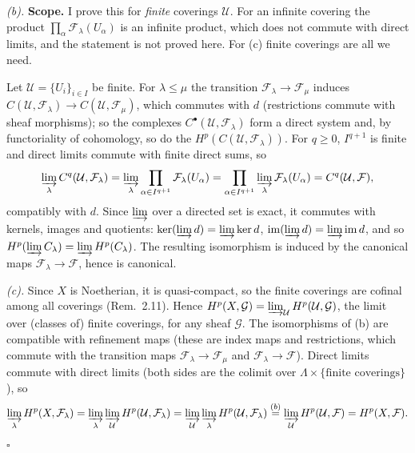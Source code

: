 \documentclass[11pt]{article}
\begin{document}
\emph{(b).} \textbf{Scope.} I prove this for \emph{finite} coverings $\mathcal U$. For an infinite covering the product $\prod_\alpha\mathcal F_\lambda(U_\alpha)$ is an infinite product, which does not commute with direct limits, and the statement is not proved here. For (c) finite coverings are all we need.

Let $\mathcal U=\{U_i\}_{i\in I}$ be finite. For $\lambda\le\mu$ the transition $\mathcal F_\lambda\to\mathcal F_\mu$ induces $C(\mathcal U,\mathcal F_\lambda)\to C(\mathcal U,\mathcal F_\mu)$, which commutes with $d$ (restrictions commute with sheaf morphisms); so the complexes $C^\bullet(\mathcal U,\mathcal F_\lambda)$ form a direct system and, by functoriality of cohomology, so do the $H^p(C(\mathcal U,\mathcal F_\lambda))$. For $q\ge0$, $I^{q+1}$ is finite and direct limits commute with finite direct sums, so
\[ \varinjlim_\lambda C^q(\mathcal U,\mathcal F_\lambda)=\varinjlim_\lambda\prod_{\alpha\in I^{q+1}}\mathcal F_\lambda(U_\alpha)=\prod_{\alpha\in I^{q+1}}\varinjlim_\lambda\mathcal F_\lambda(U_\alpha)=C^q(\mathcal U,\mathcal F), \]
compatibly with $d$. Since $\varinjlim$ over a directed set is exact, it commutes with kernels, images and quotients: $\ker(\varinjlim d)=\varinjlim\ker d$, $\operatorname{im}(\varinjlim d)=\varinjlim\operatorname{im}d$, and so $H^p(\varinjlim C_\lambda)=\varinjlim H^p(C_\lambda)$. The resulting isomorphism is induced by the canonical maps $\mathcal F_\lambda\to\mathcal F$, hence is canonical.

\emph{(c).} Since $X$ is Noetherian, it is quasi-compact, so the finite coverings are cofinal among all coverings (Rem.~2.11). Hence $H^p(X,\mathcal G)=\varinjlim_{\mathcal U}H^p(\mathcal U,\mathcal G)$, the limit over (classes of) finite coverings, for any sheaf $\mathcal G$. The isomorphisms of (b) are compatible with refinement maps (these are index maps and restrictions, which commute with the transition maps $\mathcal F_\lambda\to\mathcal F_\mu$ and $\mathcal F_\lambda\to\mathcal F$). Direct limits commute with direct limits (both sides are the colimit over $\Lambda\times\{\text{finite coverings}\}$), so
\[ \varinjlim_\lambda H^p(X,\mathcal F_\lambda)=\varinjlim_\lambda\varinjlim_{\mathcal U}H^p(\mathcal U,\mathcal F_\lambda)=\varinjlim_{\mathcal U}\varinjlim_\lambda H^p(\mathcal U,\mathcal F_\lambda)\overset{(b)}{=}\varinjlim_{\mathcal U}H^p(\mathcal U,\mathcal F)=H^p(X,\mathcal F). \]
\hfill$\square$
\end{document}
